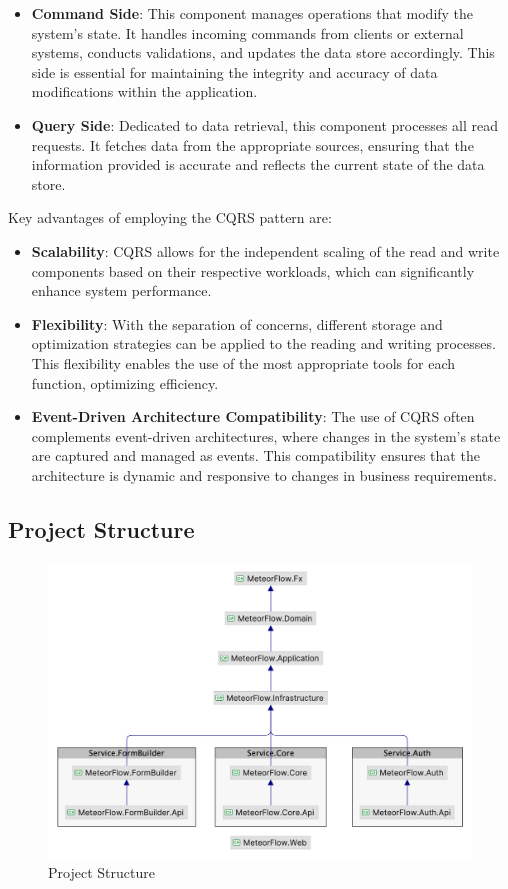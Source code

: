 \begin{itemize}
\item \textbf{Command Side}: This component manages operations that modify the
system's state. It handles incoming commands from clients or external systems,
conducts validations, and updates the data store accordingly. This side is
essential for maintaining the integrity and accuracy of data modifications
within the application.
\item \textbf{Query Side}: Dedicated to data retrieval, this component processes
all read requests. It fetches data from the appropriate sources, ensuring that
the information provided is accurate and reflects the current state of the data
store.
\end{itemize}

Key advantages of employing the CQRS pattern are:

\begin{itemize}
\item \textbf{Scalability}: CQRS allows for the independent scaling of the read
and write components based on their respective workloads, which can
significantly enhance system performance.
\item \textbf{Flexibility}: With the separation of concerns, different storage
and optimization strategies can be applied to the reading and writing processes.
This flexibility enables the use of the most appropriate tools for each
function, optimizing efficiency.
\item \textbf{Event-Driven Architecture Compatibility}: The use of CQRS often
complements event-driven architectures, where changes in the system's state are
captured and managed as events. This compatibility ensures that the architecture
is dynamic and responsive to changes in business requirements.
\end{itemize}

\subsection{Project Structure}

\begin{figure}[H]
  \centering
  \includegraphics[width=\linewidth]{Images/ProjectDir.png}
  \vspace{1em}
  \caption{Project Structure}
\end{figure}


